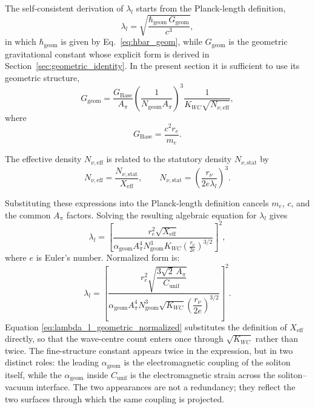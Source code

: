 \documentclass[10pt,a4paper]{article}
\begin{document}
The self-consistent derivation of \(\lambda_l\) starts from the Planck-length definition,
\begin{equation}
	\lambda_l = \sqrt{\frac{\hbar_{\text{geom}}\,G_{\text{geom}}}{c^3}},
\end{equation}
in which \(\hbar_{\text{geom}}\) is given by Eq.~\eqref{eq:hbar_geom}, while \(G_{\text{geom}}\) is the geometric gravitational constant whose explicit form is derived in Section~\ref{sec:geometric_identity}. In the present section it is sufficient to use its geometric structure,
\begin{equation}
	G_{\text{geom}}
	=
	\frac{G_{\text{Base}}}{A_\pi}
	\left(
	\frac{1}{N_{\text{geom}}A_\pi}
	\right)^3
	\frac{1}{K_{WC}\sqrt{N_{\nu,\text{eff}}}},
\end{equation}
where
\begin{equation}
	G_{\text{Base}} = \frac{c^2 r_e}{m_e}.
\end{equation}

The effective density \(N_{\nu,\text{eff}}\) is related to the statutory density \(N_{\nu,\text{stat}}\) by
\begin{equation}
	N_{\nu,\text{eff}} = \frac{N_{\nu,\text{stat}}}{X_{\text{eff}}},
	\qquad
	N_{\nu,\text{stat}}
	=
	\left(
	\frac{r_\nu}{2 e \lambda_l}
	\right)^3.
\end{equation}

Substituting these expressions into the Planck-length definition cancels \(m_e\), \(c\), and the common \(A_\pi\) factors. Solving the resulting algebraic equation for \(\lambda_l\) gives
\begin{equation}
	\lambda_l
	=
	\left[
	\frac{
		r_e^{2}\sqrt{X_{\text{eff}}}
	}{
		\alpha_{\text{geom}}
		A_\pi^{4}
		N_{\text{geom}}^{3}
		K_{WC}
		\left(
		\frac{r_\nu}{2 e}
		\right)^{3/2}
	}
	\right]^{2},
	\label{eq:lambda_l_geometric}
\end{equation}
where \(e\) is Euler's number. Normalized form is:
\begin{equation}
	\lambda_l
	=
	\left[
	\frac{
		r_e^{2}
		\sqrt{\dfrac{3 \sqrt{2} \, A_\pi}{C_{\text{unif}}}}
	}{
		\alpha_{\text{geom}}
		A_\pi^{4}
		N_{\text{geom}}^{3}
		\sqrt{K_{WC}}
		\left(
		\dfrac{r_\nu}{2 e}
		\right)^{3/2}
	}
	\right]^{2}.
	\label{eq:lambda_l_geometric_normalized}
\end{equation}
Equation \eqref{eq:lambda_l_geometric_normalized} substitutes the definition of
\(X_{\text{eff}}\) directly, so that the wave-centre count enters once
through \(\sqrt{K_{WC}}\) rather than twice. The fine-structure constant
appears twice in the expression, but in two distinct roles: the leading
\(\alpha_{\text{geom}}\) is the electromagnetic coupling of the soliton
itself, while the \(\alpha_{\text{geom}}\) inside \(C_{\text{unif}}\) is
the electromagnetic strain across the soliton--vacuum interface. The two
appearances are not a redundancy; they reflect the two surfaces through
which the same coupling is projected.
\end{document}
